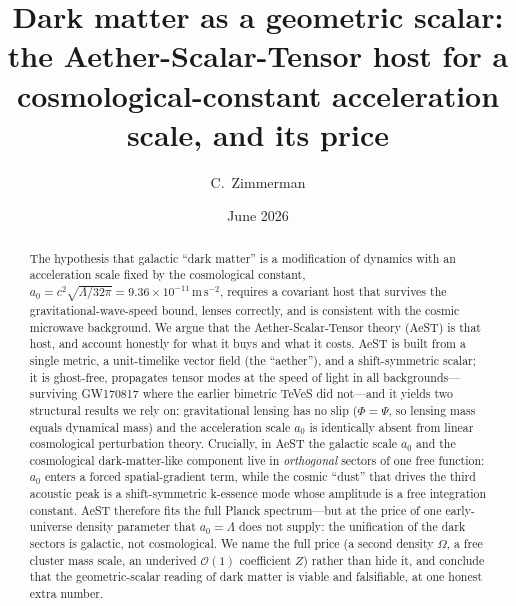 \documentclass[aps,prd,twocolumn,10pt,nofootinbib,superscriptaddress]{revtex4-2}
\begin{document}
\title{Dark matter as a geometric scalar:\\
the Aether-Scalar-Tensor host for a cosmological-constant acceleration scale, and its price}
\author{C.\ Zimmerman}
\date{June 2026}

\begin{abstract}
The hypothesis that galactic ``dark matter'' is a modification of dynamics with an acceleration scale fixed by the
cosmological constant, $a_0=c^2\sqrt{\Lambda/32\pi}=9.36\times10^{-11}\,\mathrm{m\,s^{-2}}$, requires a covariant host
that survives the gravitational-wave-speed bound, lenses correctly, and is consistent with the cosmic microwave
background. We argue that the Aether-Scalar-Tensor theory (AeST) is that host, and account honestly for what it buys
and what it costs. AeST is built from a single metric, a unit-timelike vector field (the ``aether''), and a
shift-symmetric scalar; it is ghost-free, propagates tensor modes at the speed of light in all backgrounds---surviving
GW170817 where the earlier bimetric TeVeS did not---and it yields two structural results we rely on: gravitational
lensing has no slip ($\Phi=\Psi$, so lensing mass equals dynamical mass) and the acceleration scale $a_0$ is
identically absent from linear cosmological perturbation theory. Crucially, in AeST the galactic scale $a_0$ and the
cosmological dark-matter-like component live in \emph{orthogonal} sectors of one free function: $a_0$ enters a forced
spatial-gradient term, while the cosmic ``dust'' that drives the third acoustic peak is a shift-symmetric k-essence
mode whose amplitude is a free integration constant. AeST therefore fits the full Planck spectrum---but at the price
of one early-universe density parameter that $a_0=\Lambda$ does not supply: the unification of the dark sectors is
galactic, not cosmological. We name the full price (a second density $\Omega$, a free cluster mass scale, an underived
$\mathcal{O}(1)$ coefficient $Z$) rather than hide it, and conclude that the geometric-scalar reading of dark matter
is viable and falsifiable, at one honest extra number.
\end{abstract}

\maketitle
\end{document}
